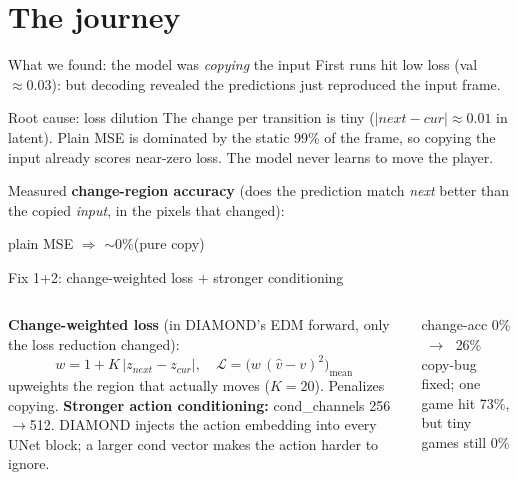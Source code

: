 \documentclass[aspectratio=169,11pt]{beamer}
\newcommand{\code}[1]{{\ttfamily\small #1}}
\newcommand{\good}[1]{\textcolor{good}{#1}}
\newcommand{\bad}[1]{\textcolor{acc}{#1}}
\begin{document}
\section{The journey}
\begin{frame}{What we found: the model was \emph{copying} the input}
  First runs hit low loss (val $\approx 0.03$): but decoding revealed the
  predictions just \alert{reproduced the input frame}.
  \vspace{0.5em}
  \begin{block}{Root cause: loss dilution}
    The change per transition is tiny ($|next-cur|\!\approx\!0.01$ in latent).
    Plain MSE is dominated by the static 99\% of the frame, so \alert{copying the
    input already scores near-zero loss}. The model never learns to move the player.
  \end{block}
  \vspace{0.3em}
  Measured \textbf{change-region accuracy} (does the prediction match \emph{next}
  better than the copied \emph{input}, in the pixels that changed):
  \begin{center}
    plain MSE $\Rightarrow$ \bad{$\sim$0\%}\quad(pure copy)
  \end{center}
\end{frame}

\begin{frame}{Fix 1+2: change-weighted loss $+$ stronger conditioning}
  \begin{columns}[T]
      \textbf{Change-weighted loss} (in DIAMOND's EDM \code{forward}, only the loss
      reduction changed):
      \[
        w = 1 + K\,|z_{next}-z_{cur}|,\quad
        \mathcal{L}=\big(w\,(\hat{v}-v)^2\big)_{\text{mean}}
      \]
      upweights the region that actually moves ($K{=}20$). Penalizes copying.
      \vspace{0.5em}
      \textbf{Stronger action conditioning:} \code{cond\_channels} 256$\to$512.
      DIAMOND injects the action embedding into every UNet block; a larger cond
      vector makes the action harder to ignore.
      \begin{block}{change-acc}
        \centering
        \bad{0\%} $\;\to\;$ \good{26\%}\\[0.3em]
        {\scriptsize copy-bug fixed; one game hit 73\%, but tiny games still 0\%}
      \end{block}
  \end{columns}
\end{frame}
\end{document}
